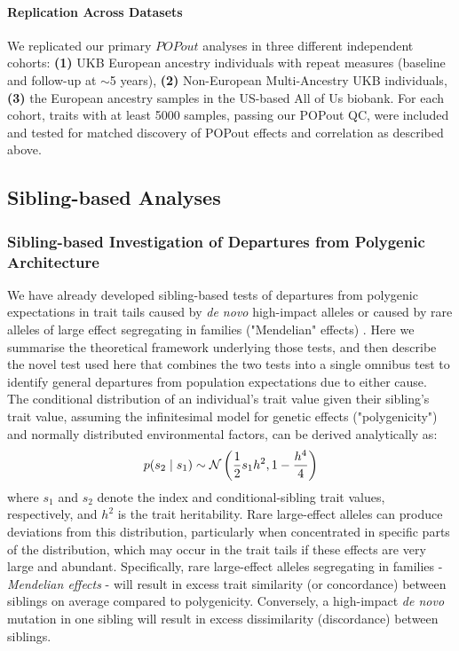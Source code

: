 \documentclass[12pt]{zHenriquesLab-StyleBioRxiv}
\begin{document}
\paragraph{Replication Across Datasets} 
We replicated our primary $POPout$ analyses in three different independent cohorts:  
\textbf{(1)} UKB European ancestry individuals with repeat measures (baseline and follow-up at $\sim$5 years), 
\textbf{(2)} Non-European Multi-Ancestry UKB individuals, \textbf{(3)} the European ancestry samples in the 
US-based All of Us biobank. For each cohort, traits with at least 5000 samples, passing our POPout QC, 
were included and tested for matched discovery of POPout effects and correlation as described above. 
%
\subsection*{Sibling-based Analyses} \label{sec:methods:sibs}  
%
\subsubsection*{Sibling-based Investigation of Departures from Polygenic Architecture}
We have already developed sibling-based tests of departures from polygenic expectations in trait tails caused by \emph{de novo} high-impact alleles or caused by rare alleles of large effect segregating in families ("Mendelian" effects) \cite{Souaiaia2024}. Here we summarise the theoretical framework underlying those tests, and then describe the novel test used here that combines the two tests into a single omnibus test to identify general departures from population expectations due to either cause. \\
The conditional distribution of an individual's trait value given their sibling's trait value, assuming the infinitesimal model for genetic effects ("polygenicity") and normally distributed environmental factors, can be derived analytically \cite{Souaiaia2024} as:
%
\begin{equation} p(s_2 \mid s_1 ) \sim \mathcal{N}\left(\frac{1}{2}s_1h^2,
1-\frac{h^4}{4}\right) \label{math:S2givenS1}
\end{equation}
where $s_1$ and $s_2$ denote the index and conditional-sibling trait
values, respectively, and $h^2$ is the trait heritability. Rare
large-effect alleles can produce deviations from this distribution,
particularly when concentrated in specific parts of the distribution, 
which may occur in the trait tails if these effects are very large 
and abundant. Specifically, rare large-effect alleles segregating 
in families - {\em Mendelian effects} - will result in excess trait 
similarity (or concordance) between siblings on average compared
to polygenicity. Conversely, a high-impact {\em de novo} mutation in one
sibling will result in excess dissimilarity (discordance) between siblings.
\end{document}
